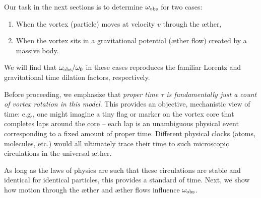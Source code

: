 Our task in the next sections is to determine $\omega_{\rm obs}$ for two cases:
\begin{enumerate}
    \item When the vortex (particle) moves at velocity $v$ through the æther,
    \item When the vortex sits in a gravitational potential (æther flow) created by a massive body.
\end{enumerate}
We will find that $\omega_{\rm obs}/\omega_0$ in these cases reproduces the familiar Lorentz and gravitational time dilation factors, respectively.

Before proceeding, we emphasize that \emph{proper time $\tau$ is fundamentally just a count of vortex rotation in this model}. This provides an objective, mechanistic view of time: e.g., one might imagine a tiny flag or marker on the vortex core that completes laps around the core – each lap is an unambiguous physical event corresponding to a fixed amount of proper time. Different physical clocks (atoms, molecules, etc.) would all ultimately trace their time to such microscopic circulations in the universal æther.

As long as the laws of physics are such that these circulations are stable and identical for identical particles, this provides a standard of time. Next, we show how motion through the æther and æther flows influence $\omega_{\rm obs}$.
